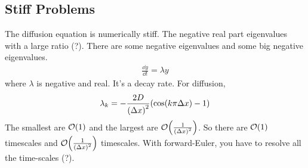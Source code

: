\documentclass{article}
\newcommand{\Dx}{\Delta x}
\begin{document}
        \subsection{Stiff Problems}

            The diffusion equation is numerically stiff.  The negative real part eigenvalues with a large ratio (?).  There are some negative eigenvalues and some big negative eigenvalues.
            \begin{align}
                \frac{\dd y}{\dd t} = \lambda y
            \end{align}
            where $\lambda$ is negative and real.  It's a decay rate.  For diffusion,
            \begin{align}
                \lambda_k = -\frac{2D}{\qty(\Dx)^2}\qty(\cos(k\pi\Dx) - 1)
            \end{align}
            The smallest are $\order{1}$ and the largest are $\order{\frac{1}{\qty(\Dx)^2}}$.  So there are $\order{1}$ timescales and $\order{\frac{1}{\qty(\Dx)^2}}$ timescales.  With forward-Euler, you have to resolve all the time-scales (?).
\end{document}
